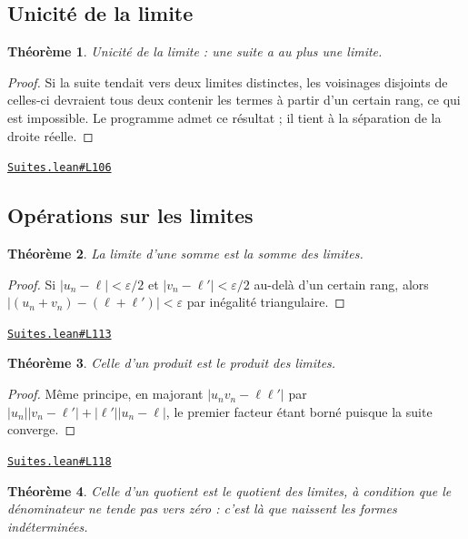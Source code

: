 \documentclass[11pt,a4paper]{article}
\theoremstyle{definition}
\theoremstyle{plain}
\newtheorem{theoreme}{Théorème}
\newcommand{\source}[2]{\par\smallskip\noindent\hfill{\footnotesize\href{#1}{\texttt{#2}}}\par\smallskip}
\begin{document}
\subsection{Unicité de la limite}

\begin{theoreme}
Unicité de la limite : une suite a au plus une limite.
\end{theoreme}

\begin{proof}
Si la suite tendait vers deux limites distinctes, les voisinages disjoints de celles-ci
devraient tous deux contenir les termes à partir d'un certain rang, ce qui est impossible.
Le programme admet ce résultat ; il tient à la séparation de la droite réelle.
\end{proof}
\source{https://github.com/Commutator-IO/learn-lean/blob/main/courses/02-lycee/03-suites/Suites.lean\#L106}{Suites.lean\#L106}

\subsection{Opérations sur les limites}

\begin{theoreme}
La limite d'une somme est la somme des limites.
\end{theoreme}

\begin{proof}
Si $|u_n - \ell| < \varepsilon/2$ et $|v_n - \ell'| < \varepsilon/2$ au-delà d'un
certain rang, alors $|(u_n + v_n) - (\ell + \ell')| < \varepsilon$ par inégalité
triangulaire.
\end{proof}
\source{https://github.com/Commutator-IO/learn-lean/blob/main/courses/02-lycee/03-suites/Suites.lean\#L113}{Suites.lean\#L113}

\begin{theoreme}
Celle d'un produit est le produit des limites.
\end{theoreme}

\begin{proof}
Même principe, en majorant $|u_n v_n - \ell\ell'|$ par
$|u_n||v_n - \ell'| + |\ell'||u_n - \ell|$, le premier facteur étant borné puisque la
suite converge.
\end{proof}
\source{https://github.com/Commutator-IO/learn-lean/blob/main/courses/02-lycee/03-suites/Suites.lean\#L118}{Suites.lean\#L118}

\begin{theoreme}
Celle d'un quotient est le quotient des limites, à condition que le dénominateur ne
tende pas vers zéro : c'est là que naissent les formes indéterminées.
\end{theoreme}
\end{document}
